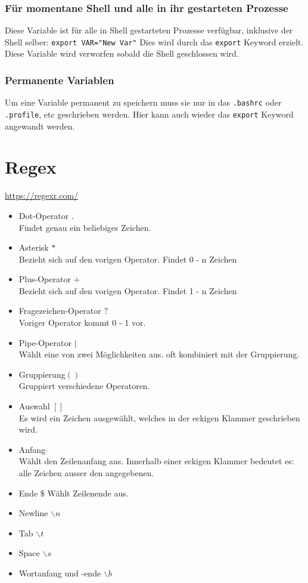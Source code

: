 \documentclass{article}
\newcommand{\cmdinline}[1]{\texttt{#1}}
\newcommand{\bashinline}[1]{\texttt{#1}}
\begin{document}
\subsubsection{Für momentane Shell und alle in ihr gestarteten Prozesse}
Diese Variable ist für alle in Shell gestarteten Prozesse verfügbar, inklusive der Shell selber:
\bashinline{export VAR="New Var"}
Dies wird durch das \cmdinline{export} Keyword erzielt.
Diese Variable wird verworfen sobald die Shell geschlossen wird.

\subsubsection{Permanente Variablen}
Um eine Variable permanent zu speichern muss sie nur in das \cmdinline{.bashrc} oder \cmdinline{.profile}, etc geschrieben werden.
Hier kann auch wieder das \cmdinline{export} Keyword angewandt werden.

\section{Regex}
\href{https://regexr.com/}{https://regexr.com/}
\begin{itemize}
\item Dot-Operator \(.\)\\
  Findet genau ein beliebiges Zeichen.
\item Asterisk \(*\)\\
  Bezieht sich auf den vorigen Operator.
  Findet 0 - n Zeichen
\item Plus-Operator \(+\)\\
  Bezieht sich auf den vorigen Operator.
  Findet 1 - n Zeichen
\item Fragezeichen-Operator \(?\)\\
  Voriger Operator kommt 0 - 1 vor.
\item Pipe-Operator \(|\)\\
  Wählt eine von zwei Möglichkeiten aus.
  oft kombiniert mit der Gruppierung.
\item Gruppierung\(()\)\\
  Gruppiert verschiedene Operatoren.
\item Auswahl \([]\)\\
  Es wird ein Zeichen ausgewählt, welches in der eckigen Klammer geschrieben wird.
\item Anfang \(\hat{}\)\\
  Wählt den Zeilenanfang aus.
  Innerhalb einer eckigen Klammer bedeutet es: alle Zeichen ausser den angegebenen.
\item Ende \(\$\)
  Wählt Zeilenende aus.
\item Newline \(\backslash n\)
\item Tab \(\backslash t\)
\item Space \(\backslash s\)
\item Wortanfang und -ende \(\backslash b\)
  
\end{itemize}
\end{document}
